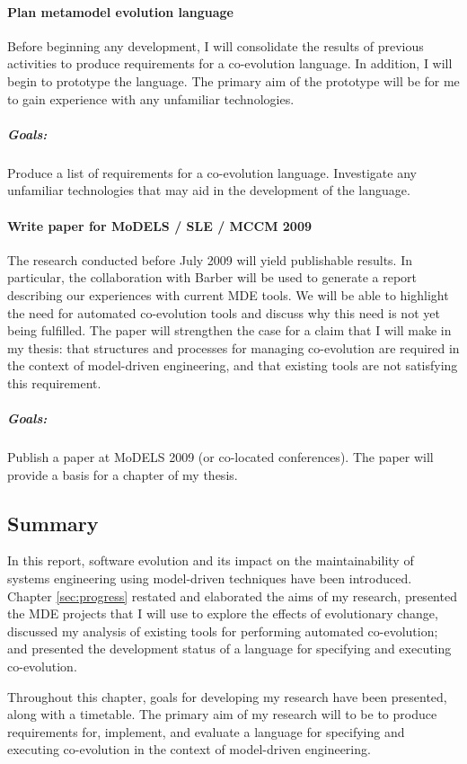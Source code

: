 

\paragraph{Plan metamodel evolution language} %
\label{par:plan_metamodel_evolution_language}
Before beginning any development, I will consolidate the results of previous activities to produce requirements for a co-evolution language. In addition, I will begin to prototype the language. The primary aim of the prototype will be for me to gain experience with any unfamiliar technologies.

\subparagraph{Goals:} Produce a list of requirements for a co-evolution language. Investigate any unfamiliar technologies that may aid in the development of the language.



\paragraph{Write paper for MoDELS / SLE / MCCM 2009} %
\label{par:write_paper_for_models_sle_mccm_2009}
The research conducted before July 2009 will yield publishable results. In particular, the collaboration with Barber will be used to generate a report describing our experiences with current MDE tools. We will be able to highlight the need for automated co-evolution tools and discuss why this need is not yet being fulfilled. The paper will strengthen the case for a claim that I will make in my thesis: that structures and processes for managing co-evolution are required in the context of model-driven engineering, and that existing tools are not satisfying this requirement.

\subparagraph{Goals:} Publish a paper at MoDELS 2009 (or co-located conferences). The paper will provide a basis for a chapter of my thesis.


\subsection{Summary}
In this report, software evolution and its impact on the maintainability of systems engineering using model-driven techniques have been introduced. Chapter \ref{sec:progress} restated and elaborated the aims of my research, presented the MDE projects that I will use to explore the effects of evolutionary change, discussed my analysis of existing tools for performing automated co-evolution; and presented the development status of a language for specifying and executing co-evolution.

Throughout this chapter, goals for developing my research have been presented, along with a timetable. The primary aim of my research will to be to produce requirements for, implement, and evaluate a language for specifying and executing co-evolution in the context of model-driven engineering.